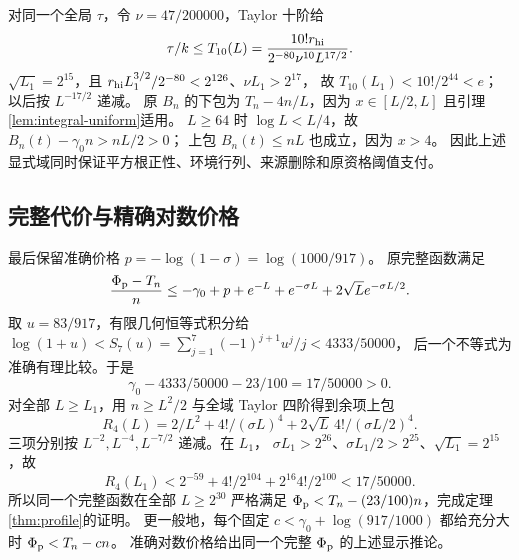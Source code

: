 \documentclass[UTF8,a4paper,11pt,fontset=fandol]{ctexart}
\theoremstyle{remark}
\begin{document}
对同一个全局 $\tau$，令 $\nu=47/200000$，Taylor 十阶给
\begin{equation}\label{eq:profile-tau-power}
 \tau/k\le T_{10}(L)=\frac{10!r_{\rm hi}}{2^{-80}\nu^{10}L^{17/2}}.
\end{equation}
$\sqrt{L_1}=2^{15}$，且
$r_{\rm hi}L_1^{3/2}/2^{-80}<2^{126}$、$\nu L_1>2^{17}$，
故 $T_{10}(L_1)<10!/2^{44}<e$；以后按 $L^{-17/2}$ 递减。
原 $B_n$ 的下包为 $T_n-4n/L$，因为 $x\in[L/2,L]$ 且引理\ref{lem:integral-uniform}适用。
$L\ge64$ 时 $\log L<L/4$，故 $B_n(t)-\gamma_0n>nL/2>0$；
上包 $B_n(t)\le nL$ 也成立，因为 $x>4$。
因此上述显式域同时保证平方根正性、环境行列、来源删除和原资格阈值支付。

\subsection{完整代价与精确对数价格}\label{subsec:profile-exact-scalar}
最后保留准确价格 $p=-\log(1-\sigma)=\log(1000/917)$。
原完整函数满足
\begin{equation}\label{eq:exact-profile-price}
 \frac{\Phi_{\rm p}-T_n}{n}
 \le-\gamma_0+p+e^{-L}+e^{-\sigma L}+2\sqrt L e^{-\sigma L/2}.
\end{equation}
取 $u=83/917$，有限几何恒等式积分给
$\log(1+u)<S_7(u)=\sum_{j=1}^7(-1)^{j+1}u^j/j<4333/50000$，
后一个不等式为准确有理比较。于是
\[
 \gamma_0-4333/50000-23/100=17/50000>0.
\]
对全部 $L\ge L_1$，用 $n\ge L^2/2$ 与全域 Taylor 四阶得到余项上包
\[
 R_4(L)=2/L^2+4!/(\sigma L)^4+2\sqrt L\,4!/(\sigma L/2)^4.
\]
三项分别按 $L^{-2},L^{-4},L^{-7/2}$ 递减。在 $L_1$，
$\sigma L_1>2^{26}$、$\sigma L_1/2>2^{25}$、$\sqrt{L_1}=2^{15}$，故
\[
 R_4(L_1)<2^{-59}+4!/2^{104}+2^{16}4!/2^{100}<17/50000.
\]
所以同一个完整函数在全部 $L\ge2^{30}$ 严格满足 $\Phi_{\rm p}<T_n-(23/100)n$，完成定理\ref{thm:profile}的证明。
更一般地，每个固定 $c<\gamma_0+\log(917/1000)$ 都给充分大时 $\Phi_{\rm p}<T_n-cn$。
准确对数价格给出同一个完整 $\Phi_{\rm p}$ 的上述显示推论。
\end{document}
